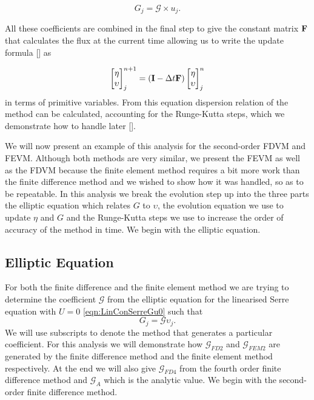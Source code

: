 \[G_j = \mathcal{G} \times u_j.\]

All these coefficients are combined in the final step to give the constant matrix $\mathbf{F}$ that calculates the flux at the current time allowing us to write the update formula [] as

\begin{equation*}
\begin{bmatrix}
\eta \\ \upsilon
\end{bmatrix}^{n+1}_j = \left(\mathbf{I}  - \Delta t \mathbf{F} \right) \begin{bmatrix}
\eta \\ \upsilon
\end{bmatrix}^{n}_j
\end{equation*}
in terms of primitive variables. From this equation dispersion relation of the method can be calculated, accounting for the Runge-Kutta steps, which we demonstrate how to handle later [].

We will now present an example of this analysis for the second-order FDVM and FEVM. Although both methods are very similar, we present the FEVM as well as the FDVM because the finite element method requires a bit more work than the finite difference method and we wished to show how it was handled, so as to be repeatable. In this analysis we break the evolution step up into the three parts the elliptic equation which relates $G$ to $\upsilon$, the evolution equation we use to update $\eta$ and $G$ and the Runge-Kutta steps we use to increase the order of accuracy of the method in time. We begin with the elliptic equation.

\subsection{Elliptic Equation}
For both the finite difference and the finite element method we are trying to determine the coefficient $\mathcal{G}$ from the elliptic equation for the linearised Serre equation with $U=0$ \eqref{eqn:LinConSerreGu0} such that
\[G_j = \mathcal{G}\upsilon_j.\]
We will use subscripts to denote the method that generates a particular coefficient. For this analysis we will demonstrate how $\mathcal{G}_{FD2}$ and $\mathcal{G}_{FEM2}$ are generated by the finite difference method and the finite element method respectively. At the end we will also give $\mathcal{G}_{FD4}$ from the fourth order finite difference method and $\mathcal{G}_A$ which is the analytic value. We begin with the second-order finite difference method.

